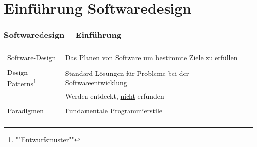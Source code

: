 

\section{Einführung Softwaredesign}%
\begin{frame}%
    \frametitle{Softwaredesign -- Einführung}

    \begin{table}[H]
        \begin{tabularx}{\linewidth}{|lX|}
                    &\\
            Software-Design&
                Das Planen von Software um bestimmte Ziele zu erfüllen\\
                           &\\
            Design Patterns\footnote{""Entwurfsmuster""}&Standard Lösungen für Probleme bei der Softwareentwicklung \\
                                                        &Werden entdeckt, \underline{nicht} erfunden\\
                    &\\
                    Paradigmen&Fundamentale Programmierstile\\
                    &\\
        \end{tabularx}
    \end{table}
    

\end{frame}






